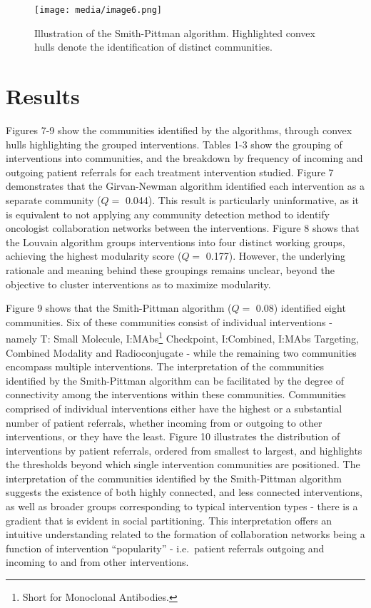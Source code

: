 \documentclass{article}
\begin{document}
\begin{figure}
\centering
\texttt{[image: media/image6.png]}
\caption{Illustration of the Smith-Pittman algorithm.
Highlighted convex hulls denote the identification of distinct
communities.}
\end{figure}

\section{Results}\label{results}

Figures 7-9 show the communities identified by the algorithms, through
convex hulls highlighting the grouped interventions. Tables 1-3
show the grouping of interventions into communities, and the breakdown
by frequency of incoming and outgoing patient referrals for each treatment
intervention studied. Figure 7 demonstrates that the Girvan-Newman
algorithm identified each intervention as a separate community (\(Q =\)
0.044). This result is particularly uninformative, as it is equivalent
to not applying any community detection method to identify oncologist collaboration 
networks between the interventions. Figure 8 shows that the Louvain
algorithm groups interventions into four distinct working groups,
achieving the highest modularity score (\(Q =\) 0.177). However, the
underlying rationale and meaning behind these groupings remains unclear,
beyond the objective to cluster interventions as to maximize
modularity.

Figure 9 shows that the Smith-Pittman algorithm (\(Q =\) 0.08)
identified eight communities. Six of these communities consist of
individual interventions - namely T: Small Molecule, I:MAbs\footnote{Short
  for Monoclonal Antibodies.} Checkpoint, I:Combined, I:MAbs Targeting,
Combined Modality and Radioconjugate - while the remaining two
communities encompass multiple interventions. The interpretation of the
communities identified by the Smith-Pittman algorithm can be facilitated
by the degree of connectivity among the interventions within these
communities. Communities comprised of individual interventions either
have the highest or a substantial number of patient referrals, whether
incoming from or outgoing to other interventions, or they have the
least. Figure 10 illustrates the distribution of interventions by
patient referrals, ordered from smallest to largest, and highlights the
thresholds beyond which single intervention communities are positioned.
The interpretation of the communities identified by the Smith-Pittman
algorithm suggests the existence of both highly connected, and less
connected interventions, as well as broader groups corresponding to
typical intervention types - there is a gradient that is evident in social partitioning. This interpretation offers an intuitive
understanding related to the formation of collaboration networks being a
function of intervention ``popularity'' - i.e.~patient referrals
outgoing and incoming to and from other interventions.
\end{document}

